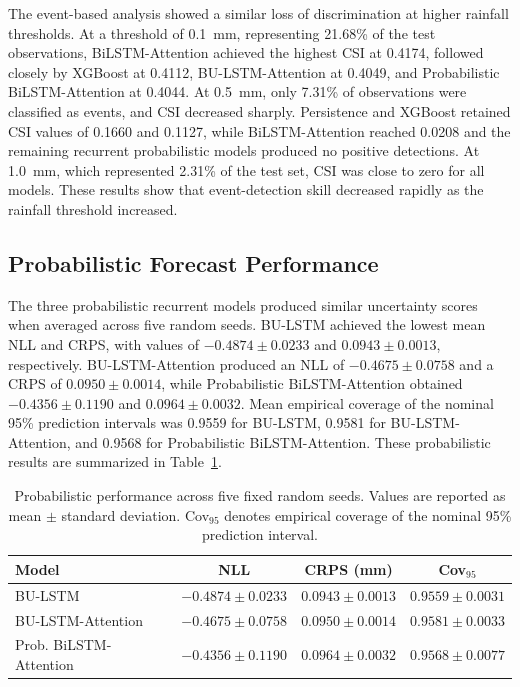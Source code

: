 \documentclass[referee,pdflatex,sn-basic]{sn-jnl}%
\theoremstyle{thmstyleone}%
\theoremstyle{thmstyletwo}%
\theoremstyle{thmstylethree}%
\begin{document}
The event-based analysis showed a similar loss of discrimination at higher rainfall thresholds. At a threshold of 0.1~mm, representing 21.68\% of the test observations, BiLSTM-Attention achieved the highest CSI at 0.4174, followed closely by XGBoost at 0.4112, BU-LSTM-Attention at 0.4049, and Probabilistic BiLSTM-Attention at 0.4044. At 0.5~mm, only 7.31\% of observations were classified as events, and CSI decreased sharply. Persistence and XGBoost retained CSI values of 0.1660 and 0.1127, while BiLSTM-Attention reached 0.0208 and the remaining recurrent probabilistic models produced no positive detections. At 1.0~mm, which represented 2.31\% of the test set, CSI was close to zero for all models. These results show that event-detection skill decreased rapidly as the rainfall threshold increased.

\subsection{Probabilistic Forecast Performance}
\label{sec:probabilistic_results}

The three probabilistic recurrent models produced similar uncertainty scores when averaged across five random seeds. BU-LSTM achieved the lowest mean NLL and CRPS, with values of $-0.4874\pm0.0233$ and $0.0943\pm0.0013$, respectively. BU-LSTM-Attention produced an NLL of $-0.4675\pm0.0758$ and a CRPS of $0.0950\pm0.0014$, while Probabilistic BiLSTM-Attention obtained $-0.4356\pm0.1190$ and $0.0964\pm0.0032$. Mean empirical coverage of the nominal 95\% prediction intervals was 0.9559 for BU-LSTM, 0.9581 for BU-LSTM-Attention, and 0.9568 for Probabilistic BiLSTM-Attention. These probabilistic results are summarized in Table~\ref{tab:probabilistic_results}.

\begin{table}[htbp]
\centering
\caption{Probabilistic performance across five fixed random seeds. Values are reported as mean $\pm$ standard deviation. Cov$_{95}$ denotes empirical coverage of the nominal 95\% prediction interval.}
\label{tab:probabilistic_results}

\small
\setlength{\tabcolsep}{4pt}

\begin{tabular}{@{}lccc@{}}
\hline
\textbf{Model} &
\textbf{NLL} &
\textbf{CRPS (mm)} &
\textbf{Cov$_{95}$} \\
\hline

BU-LSTM &
$-0.4874 \pm 0.0233$ &
$0.0943 \pm 0.0013$ &
$0.9559 \pm 0.0031$ \\

BU-LSTM-Attention &
$-0.4675 \pm 0.0758$ &
$0.0950 \pm 0.0014$ &
$0.9581 \pm 0.0033$ \\

Prob. BiLSTM-Attention &
$-0.4356 \pm 0.1190$ &
$0.0964 \pm 0.0032$ &
$0.9568 \pm 0.0077$ \\

\hline
\end{tabular}
\end{table}
\end{document}
